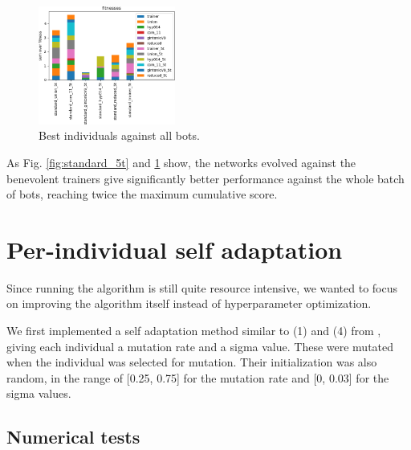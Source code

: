 \documentclass[11pt,a4paper]{scrartcl}
\begin{document}
\begin{figure}[H]
\center
\includegraphics[width=0.4\textwidth]{img/standard_5t.png}
\caption{Best individuals against all bots.}
\label{fig:standard_5t_aa}
\end{figure}

As Fig. \ref{fig:standard_5t} and \ref{fig:standard_5t_aa} show, the networks evolved against the benevolent trainers give significantly better performance against the whole batch of bots, reaching twice the maximum cumulative score.

\section{Per-individual self adaptation}
\label{sec:perind}

Since running the algorithm is still quite resource intensive, we wanted to focus on improving the algorithm itself instead of hyperparameter optimization.

We first implemented a self adaptation method similar to (1) and (4) from \cite{self_adapt}, giving each individual a mutation rate and a sigma value. These were mutated when the individual was selected for mutation. Their initialization was also random, in the range of [0.25, 0.75] for the mutation rate and [0, 0.03] for the sigma values.

\subsection{Numerical tests}
\end{document}
